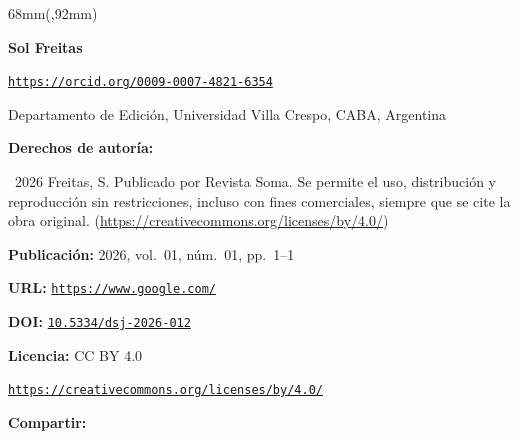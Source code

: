 \documentclass{article}
\newlength{\gbbloquex}
\begin{document}
\begin{textblock*}{68mm}(\gbbloquex,92mm)
{\setlength{\leftskip}{0pt}\setlength{\parindent}{0pt}%
\noindent\begin{minipage}[t]{68mm}
\sffamily\small\setlength{\parskip}{1pt}
{\bfseries\color{azulrevista}Sol Freitas}\par
{\scriptsize\texttt{\href{https://orcid.org/0009-0007-4821-6354}{https://orcid.org/0009-0007-4821-6354}}}\par
Departamento de Edición, Universidad Villa Crespo, CABA, Argentina\par
\vspace{6pt}
{\bfseries\color{azulrevista!70}Derechos de autor\'ia:}\par
\textcopyright\ 2026 Freitas, S. Publicado por Revista Soma. Se permite el uso, distribución y reproducción sin restricciones, incluso con fines comerciales, siempre que se cite la obra original. (\href{https://creativecommons.org/licenses/by/4.0/}{https://creativecommons.org/licenses/by/4.0/})\par\vspace{6pt}
{\bfseries\color{azulrevista!70}Publicación:} 2026, vol.~01, n\'um.~01, pp.~1--1\par\vspace{6pt}
{\bfseries\color{azulrevista!70}URL:} {\scriptsize\texttt{\href{https://www.google.com/}{https://www.google.com/}}}\par\vspace{6pt}
{\bfseries\color{azulrevista!70}DOI:} {\scriptsize\texttt{\href{https://doi.org/10.5334/dsj-2026-012}{10.5334/dsj-2026-012}}}\par\vspace{6pt}
{\bfseries\color{azulrevista!70}Licencia:} CC BY 4.0\par
{\scriptsize\texttt{\href{https://creativecommons.org/licenses/by/4.0/}{https://creativecommons.org/licenses/by/4.0/}}}\par
\vspace{6pt}
\vspace{6pt}
{\bfseries\color{azulrevista!70}Compartir:}\par\vspace{3pt}
{\large
\href{https://bsky.app/intent/compose?text=https%3A%2F%2Fwww.google.com%2F}{}~
\href{mailto:?subject=Rese%C3%B1a%20bibliogr%C3%A1fica&body=https%3A%2F%2Fwww.google.com%2F}{}~
}
\end{minipage}}
\end{textblock*}
\end{document}
